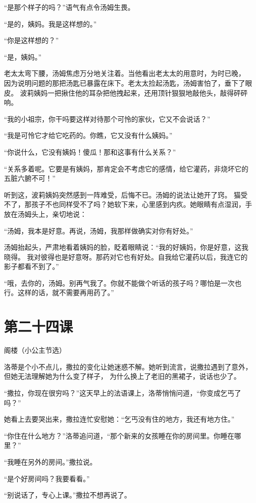 \documentclass[12pt,UTF8]{ctexbook}
\begin{document}
“是那个样子的吗？”语气有点令汤姆生畏。

“是的，姨妈。我是这样想的。”

“你是这样想的？”

“是，姨妈。”

老太太弯下腰，汤姆焦虑万分地关注着。当他看出老太太的用意时，为时已晚，
因为说明问题的那把汤匙已暴露在床下。老太太捡起汤匙，汤姆害怕了，垂下了眼皮。
波莉姨妈一把揪住他的耳杂把他拽起来，还用顶针狠狠地敲他头，敲得砰砰响。

“我的小祖宗，你干吗要这样对待那个可怜的家伙，它又不会说话？”

“我是可怜它才给它吃药的。你瞧，它又没有什么姨妈。”

“你说什么，它没有姨妈！傻瓜！那和这事有什么关系？”

“关系多着呢。它要是有姨妈，那肯定会不考虑它的感情，给它灌药，非烧坏它的五脏六腑不可！”

听到这，波莉姨妈突然感到一阵难受，后悔不已。汤姆的说法让她开了窍。
猫受不了，那孩子不也同样受不了吗？她软下来，心里感到内疚。她眼睛有点湿润，手放在汤姆头上，亲切地说：

“汤姆，我本是好意。再说，汤姆，我那样做确实对你有好处。”

汤姆抬起头，严肃地看着姨妈的脸，眨着眼睛说：“我的好姨妈，你是好意，这我晓得。
我对彼得也是好意呀。那药对它也有好处。自我给它灌药以后，我连它的影子都看不到了。”

“哦，去你的，汤姆。别再气我了。你就不能做个听话的孩子吗？哪怕是一次也行。这样的话，就不需要再用药了。”

\section{第二十四课}

阁楼（小公主节选）

洛蒂是个小不点儿，撒拉的变化让她迷惑不解。她听到流言，说撒拉遇到了意外，但她无法理解她为什么变了样子，
为什么换上了老旧的黑裙子，说话也少了。

“撒拉，你现在很穷吗？”这天早上的法语课上，洛蒂悄悄问道，“你变成乞丐了吗？”

她看上去要哭出来，撒拉连忙安慰她：“乞丐没有住的地方，我还有地方住。”

“你住在什么地方？”洛蒂追问道，“那个新来的女孩睡在你的房间里。你睡在哪里？”

“我睡在另外的房间。”撒拉说。

“是个好房间吗？我要看看。”

“别说话了，专心上课。”撒拉不想再说了。
\end{document}
